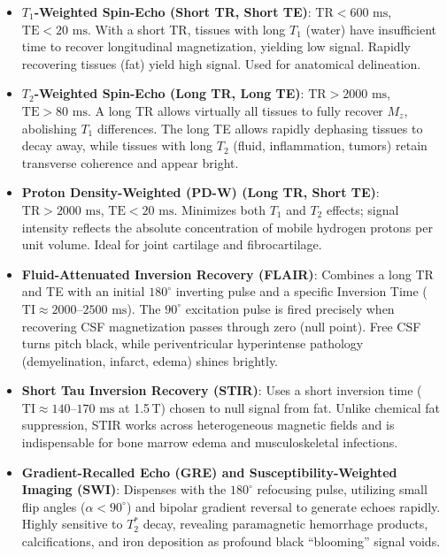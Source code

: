 \documentclass[11pt,a4paper]{article}
\begin{document}
\begin{itemize}[leftmargin=*]
    \item \textbf{$T_1$-Weighted Spin-Echo (Short TR, Short TE)}: 
    $\text{TR} < 600\text{ ms}$, $\text{TE} < 20\text{ ms}$. With a short TR, tissues with long $T_1$ (water) have insufficient time to recover longitudinal magnetization, yielding low signal. Rapidly recovering tissues (fat) yield high signal. Used for anatomical delineation.
    \item \textbf{$T_2$-Weighted Spin-Echo (Long TR, Long TE)}: 
    $\text{TR} > 2000\text{ ms}$, $\text{TE} > 80\text{ ms}$. A long TR allows virtually all tissues to fully recover $M_z$, abolishing $T_1$ differences. The long TE allows rapidly dephasing tissues to decay away, while tissues with long $T_2$ (fluid, inflammation, tumors) retain transverse coherence and appear bright.
    \item \textbf{Proton Density-Weighted (PD-W) (Long TR, Short TE)}: 
    $\text{TR} > 2000\text{ ms}$, $\text{TE} < 20\text{ ms}$. Minimizes both $T_1$ and $T_2$ effects; signal intensity reflects the absolute concentration of mobile hydrogen protons per unit volume. Ideal for joint cartilage and fibrocartilage.
    \item \textbf{Fluid-Attenuated Inversion Recovery (FLAIR)}:
    Combines a long TR and TE with an initial $180^\circ$ inverting pulse and a specific Inversion Time ($\text{TI} \approx 2000\text{--}2500\text{ ms}$). The $90^\circ$ excitation pulse is fired precisely when recovering CSF magnetization passes through zero (null point). Free CSF turns pitch black, while periventricular hyperintense pathology (demyelination, infarct, edema) shines brightly.
    \item \textbf{Short Tau Inversion Recovery (STIR)}:
    Uses a short inversion time ($\text{TI} \approx 140\text{--}170\text{ ms}$ at 1.5\,T) chosen to null signal from fat. Unlike chemical fat suppression, STIR works across heterogeneous magnetic fields and is indispensable for bone marrow edema and musculoskeletal infections.
    \item \textbf{Gradient-Recalled Echo (GRE) and Susceptibility-Weighted Imaging (SWI)}:
    Dispenses with the $180^\circ$ refocusing pulse, utilizing small flip angles ($\alpha < 90^\circ$) and bipolar gradient reversal to generate echoes rapidly. Highly sensitive to $T_2^*$ decay, revealing paramagnetic hemorrhage products, calcifications, and iron deposition as profound black ``blooming'' signal voids.
\end{itemize}
\end{document}
